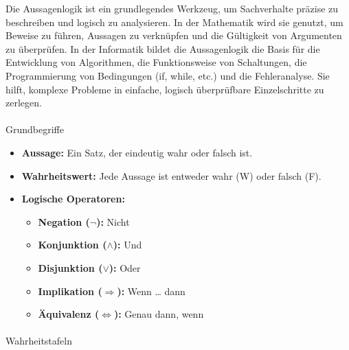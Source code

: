\documentclass[
  11pt,
  a4paper,
  DIV=11,
  numbers=noendperiod]{scrartcl}
\makeatletter
\let\oldparagraph\paragraph
\renewcommand{\paragraph}{
    \@ifstar
      \xxxParagraphStar
      \xxxParagraphNoStar
  }
\newcommand{\xxxParagraphStar}[1]{\oldparagraph*{#1}\mbox{}}
\newcommand{\xxxParagraphNoStar}[1]{\oldparagraph{#1}\mbox{}}
\providecommand{\tightlist}{%
  \setlength{\itemsep}{0pt}\setlength{\parskip}{0pt}}\usepackage{longtable,booktabs,array}
\makeatother
\begin{document}
Die Aussagenlogik ist ein grundlegendes Werkzeug, um Sachverhalte
präzise zu beschreiben und logisch zu analysieren. In der Mathematik
wird sie genutzt, um Beweise zu führen, Aussagen zu verknüpfen und die
Gültigkeit von Argumenten zu überprüfen. In der Informatik bildet die
Aussagenlogik die Basis für die Entwicklung von Algorithmen, die
Funktionsweise von Schaltungen, die Programmierung von Bedingungen (if,
while, etc.) und die Fehleranalyse. Sie hilft, komplexe Probleme in
einfache, logisch überprüfbare Einzelschritte zu zerlegen.

\paragraph{Grundbegriffe}\label{grundbegriffe}

\begin{itemize}
\tightlist
\item
  \textbf{Aussage:} Ein Satz, der eindeutig wahr oder falsch ist.
\item
  \textbf{Wahrheitswert:} Jede Aussage ist entweder wahr (W) oder falsch
  (F).
\item
  \textbf{Logische Operatoren:}

  \begin{itemize}
  \tightlist
  \item
    \textbf{Negation (\(\neg\)):} Nicht
  \item
    \textbf{Konjunktion (\(\land\)):} Und
  \item
    \textbf{Disjunktion (\(\lor\)):} Oder
  \item
    \textbf{Implikation (\(\Rightarrow\)):} Wenn \ldots{} dann
  \item
    \textbf{Äquivalenz (\(\Leftrightarrow\)):} Genau dann, wenn
  \end{itemize}
\end{itemize}

\paragraph{Wahrheitstafeln}\label{wahrheitstafeln}
\end{document}
